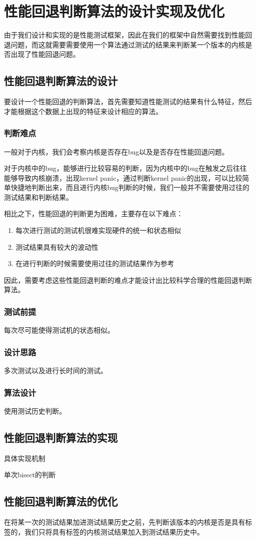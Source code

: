 

\chapter{性能回退判断算法的设计实现及优化}
由于我们设计和实现的是性能测试框架，因此在我们的框架中自然需要找到性能回退问题，而这就需要需要使用一个算法通过测试的结果来判断某一个版本的内核是否出现了性能回退问题。


\section{性能回退判断算法的设计}
要设计一个性能回退的判断算法，首先需要知道性能测试的结果有什么特征，然后才能根据这个数据上出现的特征来设计相应的算法。

\subsection{判断难点}
一般对于内核，我们会考察内核是否存在bug以及是否存在性能回退问题。

对于内核中的bug，能够进行比较容易的判断，因为内核中的bug在触发之后往往能够导致内核崩溃，出现kernel panic，通过判断kernel panic的出现，可以比较简单快捷地判断出来，而且进行内核bug判断的时候，我们一般并不需要使用过往的测试结果和判断结果。

相比之下，性能回退的判断更为困难，主要存在以下难点：
\begin{enumerate}
\item 每次进行测试的测试机很难实现硬件的统一和状态相似
\item 测试结果具有较大的波动性
\item 在进行判断的时候需要使用过往的测试结果作为参考
\end{enumerate}

因此，需要考虑这些性能回退判断的难点才能设计出比较科学合理的性能回退判断算法。
\subsection{测试前提}
每次尽可能使得测试机的状态相似。
\subsection{设计思路}
多次测试以及进行长时间的测试。
\subsection{算法设计}
使用测试历史判断。
\section{性能回退判断算法的实现}
具体实现机制

单次bisect的判断

\section{性能回退判断算法的优化}
在将某一次的测试结果加进测试结果历史之前，先判断该版本的内核是否是具有标签的，我们只将具有标签的内核测试结果加入到测试结果历史中。